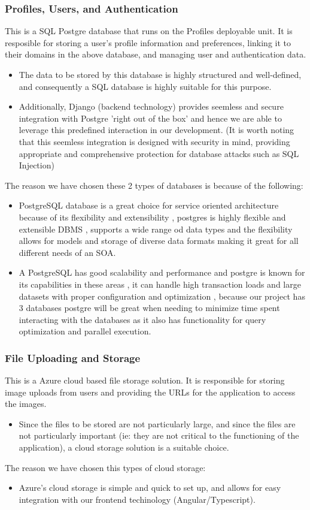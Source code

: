 \documentclass[12pt]{article}
\begin{document}
\subsubsection{Profiles, Users, and Authentication}
This is a SQL Postgre database that runs on the Profiles deployable unit. It is resposible for storing a user's profile information and preferences, linking it to their domains in the above database, and managing user and authentication data.
\begin{itemize}
    \item The data to be stored by this database is highly structured and well-defined, and consequently a SQL database is highly suitable for this purpose.
    \item Additionally, Django (backend technology) provides seemless and secure integration with Postgre 'right out of the box' and hence we are able to leverage this predefined interaction in our development. (It is worth noting that this seemless integration is designed with security in mind, providing appropriate and comprehensive protection for database attacks such as SQL Injection)
\end{itemize}
The reason we have chosen these 2 types of databases is because of the following:
\begin{itemize}
    \item PostgreSQL database is a great choice for service oriented architecture because of its flexibility and extensibility , postgres is highly flexible and extensible DBMS , supports a wide range od data types and the flexibility allows for models and storage of diverse data formats making it great for all different needs of an SOA.
    \item A PostgreSQL has good scalability and performance and postgre is known for its capabilities in these areas , it can handle high transaction loads and large datasets with proper configuration and optimization , because our project has 3 databases postgre will be great when needing to minimize time spent interacting with the databases as it also has functionality for query optimization and parallel execution.
\end{itemize}
\subsubsection{File Uploading and Storage}
This is a Azure cloud based file storage solution. It is responsible for storing image uploads from users and providing the URLs for the application to access the images.
\begin{itemize}
    \item Since the files to be stored are not particularly large, and since the files are not particularly important (ie: they are not critical to the functioning of the application), a cloud storage solution is a suitable choice.
\end{itemize}
The reason we have chosen this types of cloud storage:
\begin{itemize}
    \item Azure's cloud storage is simple and quick to set up, and allows for easy integration with our frontend techinology (Angular/Typescript).
\end{itemize}
\end{document}
